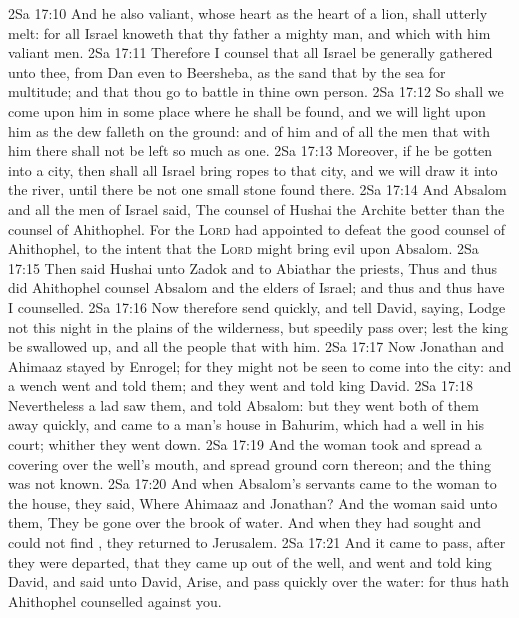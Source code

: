 \vs 2Sa 17:10 And he also  valiant, whose heart  as the heart of a lion, shall utterly melt: for all Israel knoweth that thy father  a mighty man, and  which  with him  valiant men.
\vs 2Sa 17:11 Therefore I counsel that all Israel be generally gathered unto thee, from Dan even to Beersheba, as the sand that  by the sea for multitude; and that thou go to battle in thine own person.
\vs 2Sa 17:12 So shall we come upon him in some place where he shall be found, and we will light upon him as the dew falleth on the ground: and of him and of all the men that  with him there shall not be left so much as one.
\vs 2Sa 17:13 Moreover, if he be gotten into a city, then shall all Israel bring ropes to that city, and we will draw it into the river, until there be not one small stone found there.
\vs 2Sa 17:14 And Absalom and all the men of Israel said, The counsel of Hushai the Archite  better than the counsel of Ahithophel. For the \textsc{Lord} had appointed to defeat the good counsel of Ahithophel, to the intent that the \textsc{Lord} might bring evil upon Absalom.
\vs 2Sa 17:15 Then said Hushai unto Zadok and to Abiathar the priests, Thus and thus did Ahithophel counsel Absalom and the elders of Israel; and thus and thus have I counselled.
\vs 2Sa 17:16 Now therefore send quickly, and tell David, saying, Lodge not this night in the plains of the wilderness, but speedily pass over; lest the king be swallowed up, and all the people that  with him.
\vs 2Sa 17:17 Now Jonathan and Ahimaaz stayed by Enrogel; for they might not be seen to come into the city: and a wench went and told them; and they went and told king David.
\vs 2Sa 17:18 Nevertheless a lad saw them, and told Absalom: but they went both of them away quickly, and came to a man's house in Bahurim, which had a well in his court; whither they went down.
\vs 2Sa 17:19 And the woman took and spread a covering over the well's mouth, and spread ground corn thereon; and the thing was not known.
\vs 2Sa 17:20 And when Absalom's servants came to the woman to the house, they said, Where  Ahimaaz and Jonathan? And the woman said unto them, They be gone over the brook of water. And when they had sought and could not find , they returned to Jerusalem.
\vs 2Sa 17:21 And it came to pass, after they were departed, that they came up out of the well, and went and told king David, and said unto David, Arise, and pass quickly over the water: for thus hath Ahithophel counselled against you.
